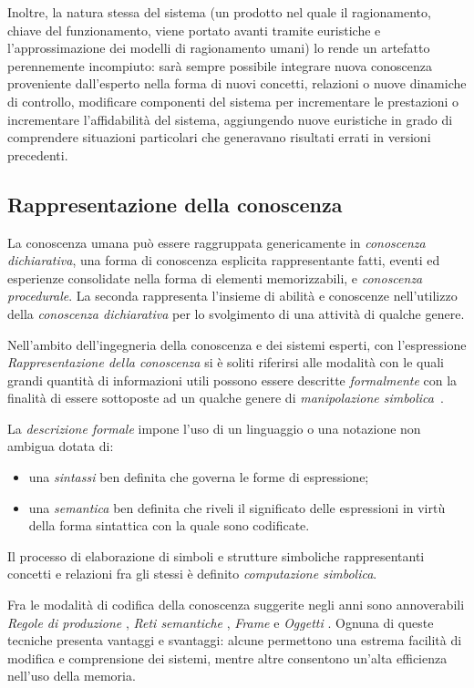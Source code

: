 Inoltre, la natura stessa del sistema (un prodotto nel quale il ragionamento, chiave del funzionamento, viene portato avanti tramite euristiche e l'approssimazione dei modelli di ragionamento umani) lo rende un artefatto perennemente incompiuto: sarà sempre possibile integrare nuova conoscenza proveniente dall'esperto nella forma di nuovi concetti, relazioni o nuove dinamiche di controllo, modificare componenti del sistema per incrementare le prestazioni o incrementare l'affidabilità del sistema, aggiungendo nuove euristiche in grado di comprendere situazioni particolari che generavano risultati errati in versioni precedenti.

\subsection{Rappresentazione della conoscenza}

La conoscenza umana può essere raggruppata genericamente in \emph{conoscenza dichiarativa}, una forma di conoscenza esplicita rappresentante fatti, eventi ed esperienze consolidate nella forma di elementi memorizzabili, e \emph{conoscenza procedurale}. La seconda rappresenta l'insieme di abilità e conoscenze nell'utilizzo della \emph{conoscenza dichiarativa} per lo svolgimento di una attività di qualche genere.


Nell'ambito dell'ingegneria della conoscenza e dei sistemi esperti, con l'espressione \emph{Rappresentazione della conoscenza} si è soliti riferirsi alle modalità con le quali grandi quantità di informazioni utili possono essere descritte \emph{formalmente} con la finalità di essere sottoposte ad un qualche genere di \emph{manipolazione simbolica}~\cite{jackson1999}.

La \emph{descrizione formale} impone l'uso di un linguaggio o una notazione non ambigua dotata di:
\begin{itemize}
	\item una \emph{sintassi} ben definita che governa le forme di espressione;
	\item una \emph{semantica} ben definita che riveli il significato delle espressioni in virtù della forma sintattica con la quale sono codificate.
\end{itemize}

Il processo di elaborazione di simboli e strutture simboliche rappresentanti concetti e relazioni fra gli stessi è definito \emph{computazione simbolica}.

Fra le modalità di codifica della conoscenza suggerite negli anni sono annoverabili \emph{Regole di produzione} \cite{davisking1975}, \emph{Reti semantiche} \cite{richens1956}, \emph{Frame} \cite{minsky1974} e \emph{Oggetti} \cite{holsapple1994object} \cite{holsapple1994operations}. Ognuna di queste tecniche presenta vantaggi e svantaggi: alcune permettono una estrema facilità di modifica e comprensione dei sistemi, mentre altre consentono un'alta efficienza nell'uso della memoria.

